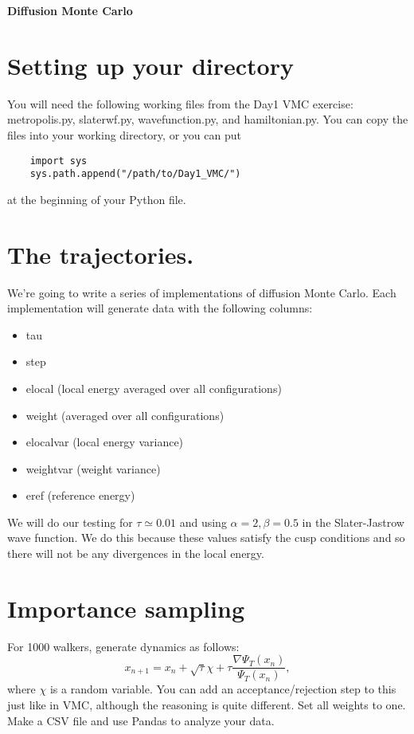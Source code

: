 \documentclass[12pt]{article}
\begin{document}
\begin{center}
	{\bf \large Diffusion Monte Carlo } 
\end{center} 

\section*{Setting up your directory} 

You will need the following working files from the Day1 VMC exercise: metropolis.py, slaterwf.py, wavefunction.py, and hamiltonian.py. 
You can copy the files into your working directory, or you can put 
\begin{verbatim}
	import sys
	sys.path.append("/path/to/Day1_VMC/")
\end{verbatim}
at the beginning of your Python file.


\section*{The trajectories.} 

We're going to write a series of implementations of diffusion Monte Carlo.
Each implementation will generate data with the following columns: 

\begin{itemize}
	\item tau
	\item step
	\item elocal (local energy averaged over all configurations)
	\item weight (averaged over all configurations)
	\item elocalvar (local energy variance)
	\item weightvar (weight variance)
	\item eref (reference energy)
\end{itemize}

We will do our testing for $\tau\simeq 0.01$ and using $\alpha=2,\beta=0.5$ in the Slater-Jastrow wave function.
We do this because these values satisfy the cusp conditions and so there will not be any divergences in the local energy.

	
\section*{Importance sampling} 

For 1000 walkers, generate dynamics as follows: 
\begin{equation}
x_{n+1} = x_n + \sqrt{\tau}\chi + \tau \frac{\nabla \Psi_T(x_n)}{\Psi_T(x_n)},
\end{equation}
where $\chi$ is a random variable. 
You can add an acceptance/rejection step to this just like in VMC, although the reasoning is quite different.
Set all weights to one.
Make a CSV file and use Pandas to analyze your data. 
\end{document}
